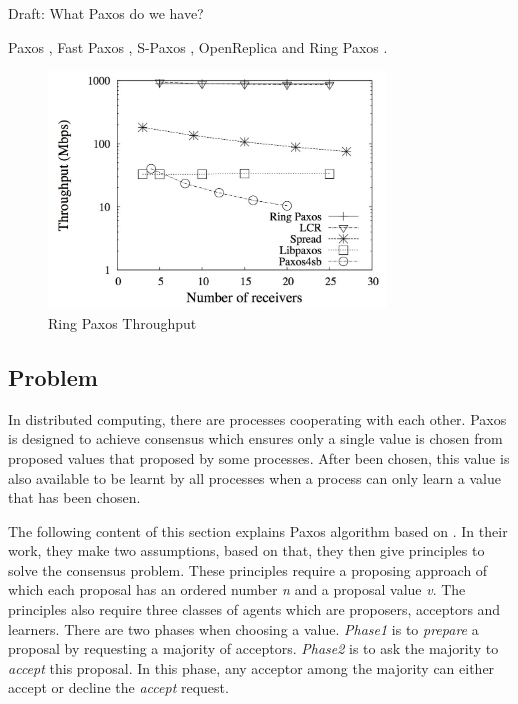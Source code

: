 \documentclass[12pt, a4paper]{article}
\begin{document}
Draft: What Paxos do we have?

Paxos \cite{lamport2001paxos}, Fast Paxos \cite{fastpaxos}, 
S-Paxos \cite{spaxos}, 
OpenReplica \cite{openreplica} and Ring Paxos \cite{ringpaxos}.

\begin{figure}[htp]
  \centering
  \includegraphics[width=0.8\textwidth]{img/RingPaxosThroughput.jpg}
  \caption{Ring Paxos Throughput}
  \label{fig:RingPaxosThroughput}
\end{figure}


\subsection{Problem}
In distributed computing, there are processes cooperating with each other. 
Paxos is designed to achieve consensus which ensures 
only a single value is chosen from proposed values that 
proposed by some processes\cite{fischer1983consensus}. 
After been chosen, this value is also available to be learnt by all processes
when a process can only learn a value that has been chosen.


The following content of this section explains 
Paxos algorithm based on \cite{fischer1983consensus}. 
In their work, they make two assumptions, 
based on that, they then give principles to solve the consensus problem. 
These principles require a proposing approach 
of which each proposal has an ordered number \textit{n} 
and a proposal value \textit{v}. 
The principles also require three classes of agents 
which are proposers, acceptors and learners. 
There are two phases when choosing a value.
\textit{Phase1} is to \textit{prepare} a proposal 
by requesting a majority of acceptors. 
\textit{Phase2} is to ask the majority to \textit{accept} this proposal.
In this phase, any acceptor among the majority can 
either accept or decline the \textit{accept} request.
\end{document}
